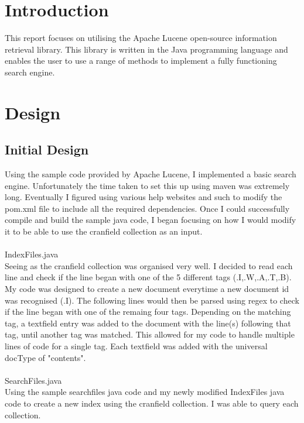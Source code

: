 
\section{Introduction}
This report focuses on utilising the Apache Lucene open-source information retrieval library. This library is written in the Java programming language and enables the user to use a range of methods to implement a fully functioning search engine.
\section{Design}
\subsection{Initial Design}
Using the sample code provided by Apache Lucene, I implemented a basic search engine. Unfortunately the time taken to set this up using maven was extremely long. Eventually I figured using various help websites and such to modify the pom.xml file to include all the required dependencies. Once I could successfully compile and build the sample java code, I began focusing on how I would modify it to be able to use the cranfield collection as an input.
\\\\
IndexFiles.java
\\
Seeing as the cranfield collection was organised very well. I decided to read each line and check if the line began with one of the 5 different tags (.I,.W,.A,.T,.B). My code was designed to create a new document everytime a new document id was recognised (.I). The following lines would then be parsed using regex to check if the line began with one of the remaing four tags. Depending on the matching tag, a textfield entry was added to the document with the line(s) following that tag, until another tag was matched. This allowed for my code to handle multiple lines of code for a single tag. Each textfield was added with the universal docType of "contents".
\\\\
SearchFiles.java
\\
Using the sample searchfiles java code and my newly modified IndexFiles java code to create a new index using the cranfield collection. I was able to query each collection.

